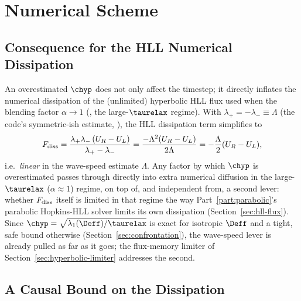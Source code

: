 \section{Numerical Scheme}

\subsection{Consequence for the HLL Numerical Dissipation}
\label{sec:hll-consequence}

An overestimated $\chyp$ does not only affect the timestep; it directly
inflates the numerical dissipation of the (unlimited) hyperbolic HLL flux
used when the blending factor $\alpha\to1$
(, the large-$\taurelax$ regime).
With
$\lambda_+=-\lambda_-\equiv\Lambda$ (the code's symmetric-ish estimate,
), the HLL dissipation term simplifies
to
\begin{equation}
  F_{\rm diss} = \frac{\lambda_+\lambda_-\,(U_R-U_L)}{\lambda_+-\lambda_-}
  = \frac{-\Lambda^2(U_R-U_L)}{2\Lambda} = -\frac{\Lambda}{2}(U_R-U_L) ,
\end{equation}
i.e.\ \emph{linear} in the wave-speed estimate $\Lambda$. Any factor by
which $\chyp$ is overestimated passes through directly into extra
numerical diffusion in the large-$\taurelax$ ($\alpha\approx1$) regime,
on top of, and independent from, a second lever: whether $F_{\rm diss}$
itself is limited in that regime the way Part~\ref{part:parabolic}'s
parabolic Hopkins-HLL solver limits its own dissipation
(Section~\ref{sec:hll-flux}). Since
$\chyp=\sqrt{\lambda_1(\Deff)/\taurelax}$ is exact for isotropic $\Deff$
and a tight, safe bound otherwise (Section~\ref{sec:confrontation}), the
wave-speed lever is already pulled as far as it goes; the flux-memory
limiter of Section~\ref{sec:hyperbolic-limiter} addresses the second.

\subsection{A Causal Bound on the Dissipation}
\label{sec:causal-bound}

